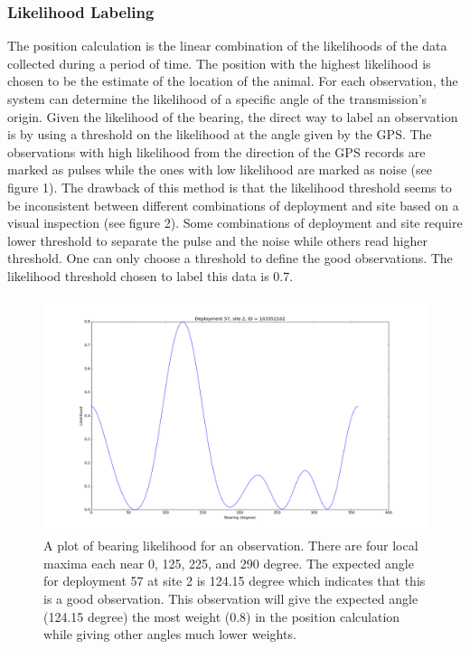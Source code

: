 \documentclass[twoside]{article}
\begin{document}
\subsubsection{Likelihood Labeling}
The position calculation is the linear combination of the likelihoods of the data collected during a period of time. The position with the highest likelihood is chosen to be the estimate of the location of the animal. For each observation, the system can determine the likelihood of a specific angle of the transmission's origin. Given the likelihood of the bearing, the direct way to label an observation is by using a threshold on the likelihood at the angle given by the GPS. The observations with high likelihood from the direction of the GPS records are marked as pulses while the ones with low likelihood are marked as noise (see figure 1). The drawback of this method is that the likelihood threshold seems to be inconsistent between different combinations of deployment and site based on a visual inspection (see figure 2). Some combinations of deployment and site require lower threshold to separate the pulse and the noise while others read higher threshold. One can only choose a threshold to define the good observations. The likelihood threshold chosen to label this data is 0.7.
\begin{figure}[h]
\centering
\includegraphics[width=\textwidth]{bearingPlot}
\caption{A plot of bearing likelihood for an observation. There are four local maxima each near 0, 125, 225, and 290 degree. The expected angle for deployment 57 at site 2 is 124.15 degree which indicates that this is a good observation. This observation will give the expected angle (124.15 degree) the most weight (0.8) in the position calculation while giving other angles much lower weights.}
\end{figure}
\end{document}
